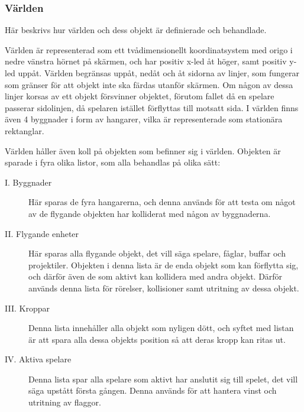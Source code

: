 \documentclass[12pt,a4paper]{article}
\newcounter{subsubsubsection}[subsubsection]
\begin{document}
\subsubsection{Världen}

Här beskrivs hur världen och dess objekt är definierade och behandlade.

Världen är representerad som ett tvådimensionellt koordinatsystem med origo i nedre vänstra hörnet på skärmen, och har positiv x-led åt höger, samt positiv y-led uppåt. Världen begränsas uppåt, nedåt och åt sidorna av linjer, som fungerar som gränser för att objekt inte ska färdas utanför skärmen. Om någon av dessa linjer korsas av ett objekt försvinner objektet, förutom fallet då en spelare passerar sidolinjen, då spelaren istället förflyttas till motsatt sida. I världen finns även 4 byggnader i form av hangarer, vilka är representerade som stationära rektanglar.


Världen håller även koll på objekten som befinner sig i världen. Objekten är sparade i fyra olika listor, som alla behandlas på olika sätt:

\begin{description}
	\item [  I. Byggnader] Här sparas de fyra hangarerna, och denna används för att testa om något av de flygande objekten har kolliderat med någon av byggnaderna.
	
	\item [  II. Flygande enheter] Här sparas alla flygande objekt, det vill säga spelare, fåglar, buffar och projektiler. Objekten i denna lista är de enda objekt som kan förflytta sig, och därför även de som aktivt kan kollidera med andra objekt. Därför används denna lista för rörelser, kollisioner samt utritning av dessa objekt.
	
	\item [  III. Kroppar] Denna lista innehåller alla objekt som nyligen dött, och syftet med listan är att spara alla dessa objekts position så att deras kropp kan ritas ut.
	
	
	\item [  IV. Aktiva spelare] Denna lista spar alla spelare som aktivt har anslutit sig till spelet, det vill säga upstått första gången. Denna används för att hantera vinst och utritning av flaggor.
\end{description}

\end{document}
